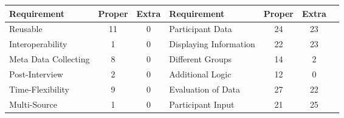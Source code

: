 
\begin{table}[htbp]
    \centering
    \small
    \begin{tabular}{lcclccc}
    \hline
    Requirement          & \multicolumn{1}{l}{Proper} & \multicolumn{1}{l}{Extra} & Requirement & \multicolumn{1}{l}{Proper} & \multicolumn{1}{l}{Extra} \\ \hline
    Reusable                                                  & 11                         & 0                         & Participant Data                                           & 24                         & 23                        \\
    Interoperability                                           & 1                          & 0                         & Displaying Information                                     & 22                         & 23                        \\
    Meta Data Collecting                                       & 8                          & 0                         & Different Groups                                           & 14                         & 2                         \\
    Post-Interview                                             & 2                          & 0                         & Additional Logic                                           & 12                         & 0                         \\
    Time-Flexibility                                           & 9                          & 0                         & Evaluation of Data                                         & 27                         & 22                        \\
    Multi-Source                                               & 1                          & 0                         & Participant Input                                          & 21                         & 25                        \\

\end{tabular}
\end{table}
